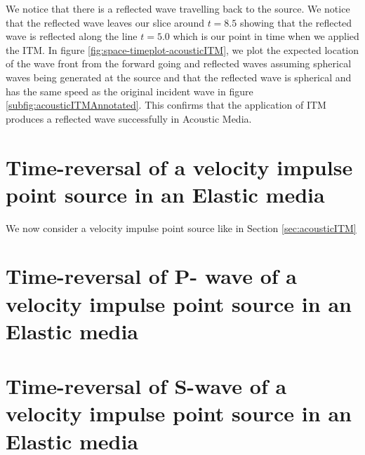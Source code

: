We notice that there is a reflected wave travelling back to the source. We notice that the reflected wave leaves our slice around $t=8.5$ showing that the reflected wave
is reflected along the line $t=5.0$ which is our point in time when we applied the \ac{ITM}. In figure \ref{fig:space-timeplot-acousticITM}, we plot the expected
location of the wave front from the forward going and reflected waves assuming spherical waves being generated at the source and that the reflected wave is spherical
and has the same speed as the original incident wave in figure \ref{subfig:acousticITMAnnotated}. This confirms that the application of \ac{ITM} produces a reflected wave
successfully in Acoustic Media. \\

\section{Time-reversal of a velocity impulse point source in an Elastic media}
We now consider a velocity impulse point source like in Section \ref{sec:acousticITM}

\section{Time-reversal of P- wave of a velocity impulse point source in an Elastic media}


\section{Time-reversal of S-wave of a velocity impulse point source in an Elastic media}